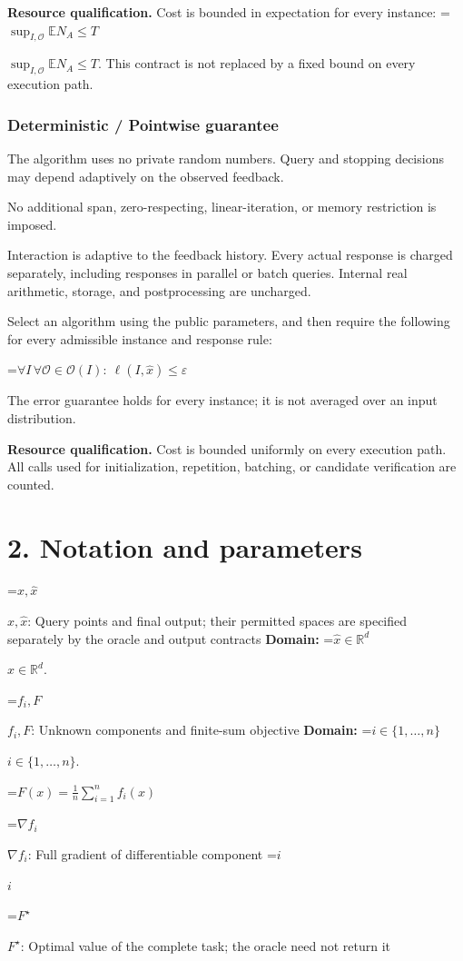 \documentclass[10pt,a4paper]{article}
\newcommand{\AtlasMath}[1]{\par\begingroup\centering\setbox0=\hbox{$\displaystyle #1$}\ifdim\wd0>1.4\linewidth\typeout{ATLAS WIDE FORMULA: \the\wd0}\fi\ifdim\wd0>\linewidth\resizebox{\linewidth}{!}{\box0}\else\box0\fi\par\endgroup}
\newcommand{\AtlasInlineMath}[1]{\begingroup\setbox0=\hbox{$#1$}\ifdim\wd0>.4\linewidth\endgroup\AtlasMath{#1}\else\endgroup$#1$\fi}
\begin{document}
\textbf{Resource qualification.} Cost is bounded in expectation for every instance: \AtlasInlineMath{\sup_{I,\mathcal O}\mathbb E N_A\le T}. This contract is not replaced by a fixed bound on every execution path.

\subsubsection{Deterministic / Pointwise guarantee}
The algorithm uses no private random numbers. Query and stopping decisions may depend adaptively on the observed feedback.

No additional span, zero-respecting, linear-iteration, or memory restriction is imposed.

Interaction is adaptive to the feedback history. Every actual response is charged separately, including responses in parallel or batch queries. Internal real arithmetic, storage, and postprocessing are uncharged.

Select an algorithm using the public parameters, and then require the following for every admissible instance and response rule:


\AtlasMath{\forall I\,\forall\mathcal{O}\in\mathcal{O}(I):\ \ell(I,\widehat{x})\le\varepsilon}


The error guarantee holds for every instance; it is not averaged over an input distribution.

\textbf{Resource qualification.} Cost is bounded uniformly on every execution path. All calls used for initialization, repetition, batching, or candidate verification are counted.

\section{2. Notation and parameters}
\AtlasInlineMath{x,\widehat{x}}: Query points and final output; their permitted spaces are specified separately by the oracle and output contracts \textbf{Domain:} \AtlasInlineMath{\widehat{x}\in \mathbb{R}^d}.

\AtlasInlineMath{f_i,F}: Unknown components and finite-sum objective \textbf{Domain:} \AtlasInlineMath{i\in\{1,\ldots,n\}}.


\AtlasMath{F(x)=\frac1n\sum_{i=1}^n f_i(x)}


\AtlasInlineMath{\nabla f_i}: Full gradient of differentiable component \AtlasInlineMath{i}

\AtlasInlineMath{F^\star}: Optimal value of the complete task; the oracle need not return it
\end{document}

